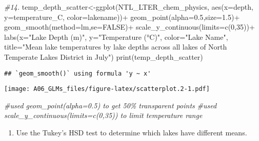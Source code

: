 \documentclass[
]{article}
\newenvironment{Shaded}{\begin{snugshade}}{\end{snugshade}}
\newcommand{\AttributeTok}[1]{\textcolor[rgb]{0.77,0.63,0.00}{#1}}
\newcommand{\CommentTok}[1]{\textcolor[rgb]{0.56,0.35,0.01}{\textit{#1}}}
\newcommand{\ConstantTok}[1]{\textcolor[rgb]{0.00,0.00,0.00}{#1}}
\newcommand{\DecValTok}[1]{\textcolor[rgb]{0.00,0.00,0.81}{#1}}
\newcommand{\FloatTok}[1]{\textcolor[rgb]{0.00,0.00,0.81}{#1}}
\newcommand{\FunctionTok}[1]{\textcolor[rgb]{0.00,0.00,0.00}{#1}}
\newcommand{\NormalTok}[1]{#1}
\newcommand{\OtherTok}[1]{\textcolor[rgb]{0.56,0.35,0.01}{#1}}
\newcommand{\SpecialCharTok}[1]{\textcolor[rgb]{0.00,0.00,0.00}{#1}}
\newcommand{\StringTok}[1]{\textcolor[rgb]{0.31,0.60,0.02}{#1}}
\providecommand{\tightlist}{%
  \setlength{\itemsep}{0pt}\setlength{\parskip}{0pt}}
\begin{document}
\begin{Shaded}
\begin{Highlighting}[]
\CommentTok{\#14.}
\NormalTok{temp\_depth\_scatter}\OtherTok{\textless{}{-}}\FunctionTok{ggplot}\NormalTok{(NTL\_LTER\_chem\_physics, }
                           \FunctionTok{aes}\NormalTok{(}\AttributeTok{x=}\NormalTok{depth, }\AttributeTok{y=}\NormalTok{temperature\_C,}
                           \AttributeTok{color=}\NormalTok{lakename))}\SpecialCharTok{+}
                          \FunctionTok{geom\_point}\NormalTok{(}\AttributeTok{alpha=}\FloatTok{0.5}\NormalTok{,}\AttributeTok{size=}\FloatTok{1.5}\NormalTok{)}\SpecialCharTok{+}
                          \FunctionTok{geom\_smooth}\NormalTok{(}\AttributeTok{method=}\NormalTok{lm,}\AttributeTok{se=}\ConstantTok{FALSE}\NormalTok{)}\SpecialCharTok{+}
                          \FunctionTok{scale\_y\_continuous}\NormalTok{(}\AttributeTok{limits=}\FunctionTok{c}\NormalTok{(}\DecValTok{0}\NormalTok{,}\DecValTok{35}\NormalTok{))}\SpecialCharTok{+}
                          \FunctionTok{labs}\NormalTok{(}\AttributeTok{x=}\StringTok{"Lake Depth (m)"}\NormalTok{, }\AttributeTok{y=}\StringTok{"Temperature (°C)"}\NormalTok{,}
                               \AttributeTok{color=}\StringTok{"Lake Name"}\NormalTok{,}
                               \AttributeTok{title=}\StringTok{"Mean lake temperatures by lake depths across all lakes of North Temperate Lakes District in July"}\NormalTok{)}
\FunctionTok{print}\NormalTok{(temp\_depth\_scatter)}
\end{Highlighting}
\end{Shaded}

\begin{verbatim}
## `geom_smooth()` using formula 'y ~ x'
\end{verbatim}

\texttt{[image: A06\_GLMs\_files/figure-latex/scatterplot.2-1.pdf]}

\begin{Shaded}
\begin{Highlighting}[]
\CommentTok{\#used geom\_point(alpha=0.5) to get 50\% transparent points}
\CommentTok{\#used scale\_y\_continuous(limits=c(0,35)) to limit temperature range }
\end{Highlighting}
\end{Shaded}

\begin{enumerate}
\def\labelenumi{\arabic{enumi}.}
\setcounter{enumi}{14}
\tightlist
\item
  Use the Tukey's HSD test to determine which lakes have different
  means.
\end{enumerate}
\end{document}
